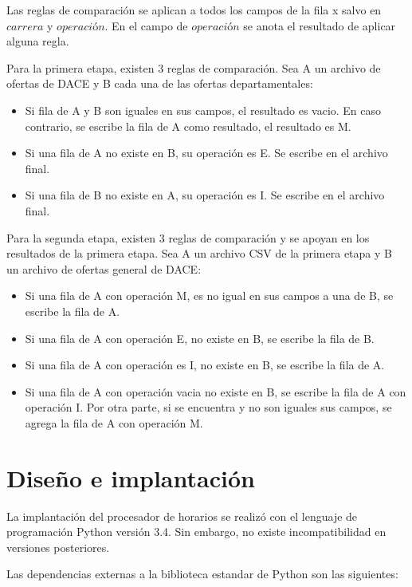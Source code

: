\documentclass[]{article}
\begin{document}
Las reglas de comparación se aplican a todos los campos de la fila x
salvo en $carrera$ y $operación$. En el campo de $operación$ se anota el
resultado de aplicar alguna regla.

Para la primera etapa, existen 3 reglas de comparación. Sea A un archivo
de ofertas de DACE y B cada una de las ofertas departamentales: 
\begin{itemize}
\item
  Si fila de A y B son iguales en sus campos, el resultado es vacio. En caso
  contrario, se escribe la fila de A como resultado, el resultado es M.

\item
  Si una fila de A no existe en B, su operación es E. Se escribe en el
  archivo final.
\item
  Si una fila de B no existe en A, su operación es I. Se escribe en el
  archivo final.
\end{itemize}

Para la segunda etapa, existen 3 reglas de comparación y se apoyan en
los resultados de la primera etapa. Sea A un archivo CSV de la primera
etapa y B un archivo de ofertas general de DACE:

\begin{itemize}
\item
  Si una fila de A con operación M, es no igual en sus campos a una de
  B, se escribe la fila de A.
\item
  Si una fila de A con operación E, no existe en B, se escribe la fila
  de B.
\item
  Si una fila de A con operación es I, no existe en B, se escribe la
  fila de A.
\item
  Si una fila de A con operación vacia no existe en B, se escribe la
  fila de A con operación I. Por otra parte, si se encuentra y no son
  iguales sus campos, se agrega la fila de A con operación M.
\end{itemize}

\section{Diseño e implantación}\label{diseuxf1o-e-implantaciuxf3n}

La implantación del procesador de horarios se realizó con el lenguaje de
programación Python versión 3.4. Sin embargo, no existe incompatibilidad
en versiones posteriores.

Las dependencias externas a la biblioteca estandar de Python son las
siguientes:
\end{document}
